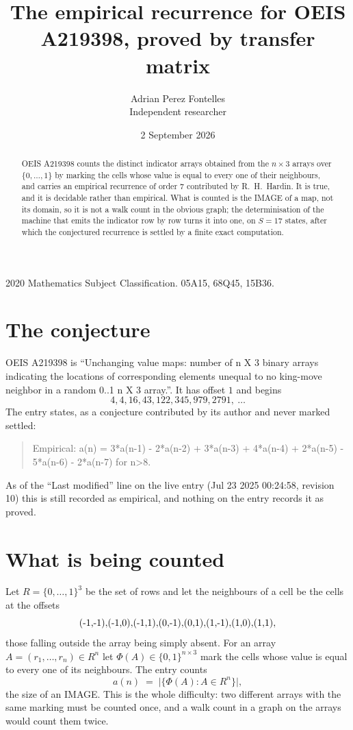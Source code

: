 \documentclass[11pt,a4paper]{article}
\title{The empirical recurrence for OEIS A219398, proved by transfer matrix}
\author{Adrian Perez Fontelles\\ \small Independent researcher}
\date{2 September 2026}
\theoremstyle{plain}
\theoremstyle{definition}
\begin{document}
\maketitle

\begin{abstract}
OEIS A219398 counts the distinct indicator arrays obtained from the $n\times3$ arrays over
$\{0,\dots,1\}$ by marking the cells whose value is equal to every one of their neighbours, and carries an
empirical recurrence of order $7$ contributed by R.~H.~Hardin. It is true, and it is
decidable rather than empirical. What is counted is the IMAGE of a map, not its domain, so it
is not a walk count in the obvious graph; the determinisation of the machine that emits the
indicator row by row turns it into one, on $S=17$ states, after which the conjectured
recurrence is settled by a finite exact computation.
\end{abstract}

\noindent\small 2020 Mathematics Subject Classification. 05A15, 68Q45, 15B36.\normalsize

\section{The conjecture}

OEIS A219398 is ``Unchanging value maps: number of n X 3 binary arrays indicating the locations of corresponding elements unequal to no king-move neighbor in a random 0..1 n X 3 array.''. It has offset $1$ and begins
\[
4, 4, 16, 43, 122, 345, 979, 2791,\ \dots
\]
The entry states, as a conjecture contributed by its author and never marked settled:
\begin{quote}
Empirical: a(n) = 3*a(n-1) - 2*a(n-2) + 3*a(n-3) + 4*a(n-4) + 2*a(n-5) - 5*a(n-6) - 2*a(n-7) for n>8.
\end{quote}
As of the ``Last modified'' line on the live entry (Jul 23 2025 00:24:58, revision 10) this is still
recorded as empirical, and nothing on the entry records it as proved.

\section{What is being counted}

Let $R=\{0,\dots,1\}^{3}$ be the set of rows and let the neighbours of a cell be the
cells at the offsets
\[
$(-1,-1)$, $(-1,0)$, $(-1,1)$, $(0,-1)$, $(0,1)$, $(1,-1)$, $(1,0)$, $(1,1)$,
\]
those falling outside the array being simply absent. For an array
$A=(r_1,\dots,r_n)\in R^n$ let $\Phi(A)\in\{0,1\}^{n\times3}$ mark the cells whose value
is equal to every one of its neighbours. The entry counts
\[
a(n)\;=\;\bigl|\{\Phi(A):A\in R^n\}\bigr| ,
\]
the size of an IMAGE. This is the whole difficulty: two different arrays with the same marking
must be counted once, and a walk count in a graph on the arrays would count them twice.
\end{document}
